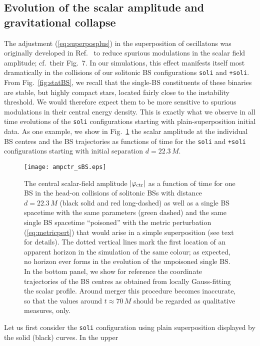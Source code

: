 \documentclass[11pt]{report}  %
\begin{document}
\subsection{Evolution of the scalar amplitude and gravitational collapse}
%
The adjustment (\ref{eq:superposplus}) in the superposition of oscillatons
was originally developed in Ref.~\cite{Helfer:2018vtq} to reduce
spurious modulations in the scalar field amplitude; cf.~their
Fig.~7. In our simulations, this effect manifests itself
most dramatically in the collisions of our solitonic BS
configurations {\tt soli} and {\tt +soli}.
From Fig.~\ref{fig:statBS}, we recall that the single-BS constituents
of these binaries are stable, but highly compact stars, located
fairly close to the instability threshold. We would therefore expect
them to be more sensitive to spurious modulations in their central
energy density. This is exactly what we observe in all time evolutions
of the {\tt soli} configurations starting with plain-superposition
initial data. As one example, we show
in Fig.~\ref{fig:soli_ampctr} the scalar amplitude
at the individual BS centres and the BS trajectories
as functions of time for the
{\tt soli} and {\tt +soli} configurations starting with initial
separation $d=22.3\,M$.
%
\begin{figure}
    \centering
    \texttt{[image: ampctr\_sBS.eps]}
    \caption{The central scalar-field amplitude $|\varphi_{\rm ctr}|$ 
    as a function of time for one BS in the head-on
    collisions of solitonic BSs with distance $d=22.3\,M$
    (black solid and red long-dashed) as well as a single
    BS spacetime with the same parameters (green dashed)
    and the same single BS spacetime ``poisoned'' with
    the metric perturbation (\ref{eq:metricpert}) that would arise in a simple
    superposition (see text for details). The dotted
    vertical lines mark the first location of an
    apparent horizon in the simulation of the same colour;
    as expected, no horizon ever forms in the evolution
    of the unpoisoned single BS.
    In the bottom panel, we show for reference the coordinate
    trajectories of the BS centres as obtained from locally
    Gauss-fitting the scalar profile. Around merger this procedure
    becomes inaccurate, so that the values around $t\approx 70\,M$
    should be regarded as qualitative measures, only.
    }
    \label{fig:soli_ampctr}
\end{figure}
%
Let us first consider the {\tt soli} configuration using plain
superposition displayed by the solid (black) curves. In the upper
\end{document}
